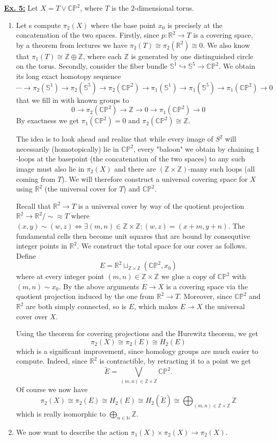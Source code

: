 \documentclass[a4paper, 12pt]{article}
\renewcommand{\S}{\mathbb{S}}
\newcommand{\N}{\mathbb{N}}
\newcommand{\Z}{\mathbb{Z}}
\newcommand{\R}{\mathbb{R}}
\newcommand{\C}{\mathbb{C}}
\renewcommand{\P}{\mathbb{P}}
\newcommand{\iso}{\cong}
\newcommand{\homeo}{\approx}
\begin{document}
\underline{\textbf{Ex. 5:}}
Let $X = T \vee \C\P^2$, where $T$ is the $2$-dimensional torus.

\begin{enumerate}[label=(\alph*)]
	\item Let s compute $\pi_2(X)$ where the base point $x_0$ is precisely at the concatenation of the two spaces. 
	Firstly, since $p\colon \R^2 \to T$ is a covering space, by a theorem from lectures we have $\pi_2(T) \iso \pi_2(\R^2) \iso 0$.
	We also know that $\pi_1(T) \iso \Z \oplus \Z$, where each $\Z$ is generated by one distinguished circle on the torus.
	Secondly, consider the fiber bundle $\S^1 \hookrightarrow \S^5 \to \C\P^2$. We obtain its long exact homotopy sequence
	\[
	\cdots \xrightarrow{} \pi_2(\S^1) \xrightarrow{} \pi_2(\S^5) \xrightarrow{} \pi_2(\C\P^2) \xrightarrow{} \pi_1(\S^1) \xrightarrow{} \pi_1(\S^5) \xrightarrow{} \pi_1(\C\P^2) \xrightarrow{} 0
	\]
	that we fill in with known groups to
	\[
	0 \xrightarrow{} \pi_2(\C\P^2) \xrightarrow{} \Z \xrightarrow{} 0  \xrightarrow{} \pi_1(\C\P^2) \xrightarrow{} 0
	\]
	By exactness we get $\pi_1(\C\P^2) = 0$ and $\pi_2(\C\P^2) \iso \Z$.
	
	The idea is to look ahead and realize that while every image of $S^2$ will necessarily (homotopically) lie in $\C\P^2$, every "baloon" we obtain by chaining $1$-loops at the basepoint (the concatenation of the two spaces) to any such image must also lie in $\pi_2(X)$ and there are $(\Z\times\Z)$-many such loops (all coming from $T$). We will therefore construct a universal covering space for $X$ using $\R^2$ (the universal cover for $T$) and $\C\P^2$.
	
	Recall that $\R^2 \to T$ is a universal cover by way of the quotient projection $\R^2 \to \R^2/\sim \homeo T$ where $(x, y) \sim (w, z) \iff \exists (m, n) \in \Z\times\Z \colon (w, z) = (x + m, y + n)$. The fundamental cells then become unit squares that are bound by consequtive integer points in $\R^2$. We construct the total space for our cover as follows. Define
	\[
	E = \R^2 \sqcup_{\Z\times\Z} (\C\P^2, x_0)
	\]
	where at every integer point $(m, n) \in \Z\times\Z$ we glue a copy of $\C\P^2$ with $(m, n) \sim x_0$.
	By the above arguments $E \to X$ is a covering space via the quotient projection induced by the one from $\R^2  \to T$. Moreover, since $\C\P^2$ and $\R^2$ are both simply connected, so is $E$, which makes $E \to X$ the universal cover over $X$.
	
	Using the theorem for covering projections and the Hurewitz theorem, we get
	\[
	\pi_2(X) \iso \pi_2(E) \iso H_2(E)
	\]
	which is a significant improvement, since homology groups are much easier to compute. Indeed, since $\R^2$ is contractible, by retracting it to a point we get
	\[
	\widetilde{E} = \bigvee_{(m, n) \in \Z\times\Z} \C\P^2.
	\]
	Of course we now have
	\[
	\pi_2(X) \iso \pi_2(E) \iso H_2(E) \iso H_2(\widetilde{E}) \iso \bigoplus_{(m, n) \in \Z\times\Z} \Z
	\]
	which is really isomorphic to $\bigoplus_{n \in \N} \Z$.
	\item We now want to describe the action $\pi_1(X) \times \pi_2(X) \to \pi_2(X)$.
	

\end{enumerate}
\end{document}
